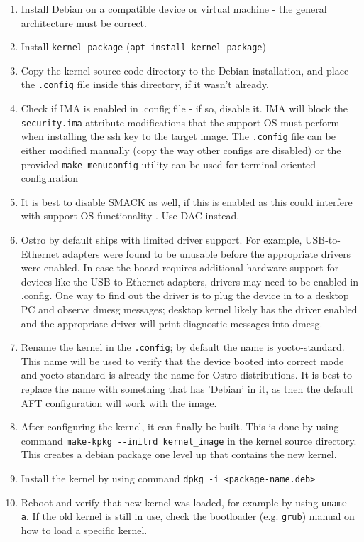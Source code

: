 \documentclass[a4paper,11pt]{article}
\newcommand{\cmd}[1]{\texttt{#1}}
\begin{document}
\begin{enumerate}

\item Install Debian on a compatible device or virtual machine - the general architecture must be correct.

\item Install \cmd{kernel-package} (\cmd{apt install kernel-package})

\item Copy the kernel source code directory to the Debian installation, and place the \cmd{.config} file inside this directory, if it wasn't already.

\item Check if IMA is enabled in .config file - if so, disable it. IMA will block the \cmd{security.ima} attribute modifications that the support OS must perform when installing the ssh key to the target image. The \cmd{.config} file can be either modified manually (copy the way other configs are disabled) or the provided \cmd{make menuconfig} utility can be used for terminal-oriented configuration

\item It is best to disable SMACK as well, if this is enabled as this could interfere with support OS functionality . Use DAC instead.


\item Ostro by default ships with limited driver support. For example, USB-to-Ethernet adapters were found to be unusable before the appropriate drivers were enabled. In case the board requires additional hardware support for devices like the USB-to-Ethernet adapters, drivers may need to be enabled in .config. One way to find out the driver is to plug the device in to a desktop PC and observe dmesg messages; desktop kernel likely has the driver enabled and the appropriate driver will print diagnostic messages into dmesg.

\item Rename the kernel in the \cmd{.config}; by default the name is yocto-standard. This name will be used to verify that the device booted into correct mode and yocto-standard is already the name for Ostro distributions. It is best to replace the name with something that has 'Debian' in it, as then the default AFT configuration will work with the image.

\item After configuring the kernel, it can finally be built. This is done by using command \cmd{make-kpkg -{}-initrd kernel\_image} in the kernel source directory. This creates a debian package one level up that contains the new kernel.

\item Install the kernel by using command \cmd{dpkg -i <package-name.deb>}

\item Reboot and verify that new kernel was loaded, for example by using \cmd{uname -a}. If the old kernel is still in use, check the bootloader (e.g. \cmd{grub}) manual on how to load a specific kernel.

\end{enumerate}
\end{document}
